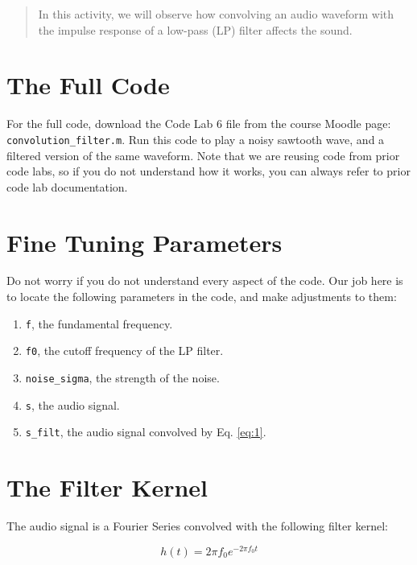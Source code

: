\documentclass[10.5pt]{article}
\begin{document}
\twocolumn
\maketitle

\begin{abstract}
In this activity, we will observe how convolving an audio waveform with the impulse response of a low-pass (LP) filter affects the sound.
\end{abstract}

\section{The Full Code}

For the full code, download the Code Lab 6 file from the course Moodle page: \verb+convolution_filter.m+.  Run this code to play a noisy sawtooth wave, and a filtered version of the same waveform.  Note that we are reusing code from prior code labs, so if you do not understand how it works, you can always refer to prior code lab documentation.

\section{Fine Tuning Parameters}

Do not worry if you do not understand every aspect of the code.  Our job here is to locate the following parameters in the code, and make adjustments to them:

\begin{enumerate}
\item \verb+f+, the fundamental frequency.
\item \verb+f0+, the cutoff frequency of the LP filter.
\item \verb+noise_sigma+, the strength of the noise.
\item \verb+s+, the audio signal.
\item \verb+s_filt+, the audio signal convolved by Eq. \ref{eq:1}.
\end{enumerate}

\section{The Filter Kernel}

The audio signal is a Fourier Series convolved with the following filter kernel:

\begin{equation}
h(t) = 2\pi f_0 e^{-2\pi f_0 t} \label{eq:1}
\end{equation}
\end{document}

